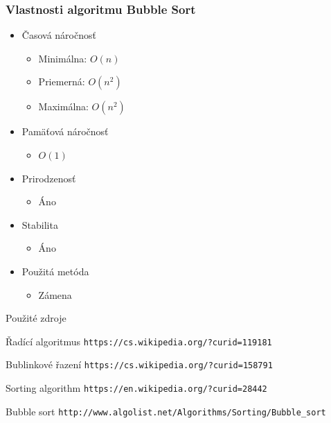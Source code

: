 \documentclass[11pt, xcolor=table]{beamer}
\begin{document}
\begin{frame}
\frametitle{Vlastnosti algoritmu Bubble Sort}
	\begin{itemize}
	\item Časová náročnosť
	\begin{itemize}
		\item Minimálna: $O(n)$
		\item Priemerná: $O(n^2)$
		\item Maximálna: $O(n^2)$
	\end{itemize}
	\item Pamäťová náročnosť
	\begin{itemize}
		\item $O(1)$
	\end{itemize}
	\item Prirodzenosť
	\begin{itemize}
		\item Áno
	\end{itemize}
	\item Stabilita
	\begin{itemize}
		\item Áno
	\end{itemize}
	\item Použitá metóda
	\begin{itemize}
		\item Zámena
	\end{itemize}
\end{itemize}
\end{frame}

\begin{frame}{Použité zdroje}
\begin{thebibliography}{8}
	\small
	 Řadící algoritmus
	\newblock  \texttt{https://cs.wikipedia.org/?curid=119181}
	
	 Bublinkové řazení
	\newblock \small \texttt{https://cs.wikipedia.org/?curid=158791}
	
	 Sorting algorithm
	\newblock \texttt{https://en.wikipedia.org/?curid=28442}
	
	 Bubble sort
	\newblock \texttt{http://www.algolist.net/Algorithms/Sorting/Bubble\_sort}
\end{thebibliography}
\end{frame}
\end{document}
